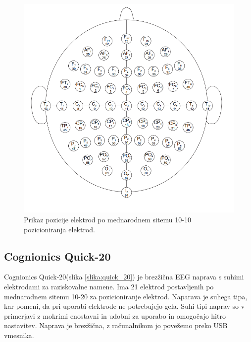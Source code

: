\begin{figure}
        \begin{center}
        \includegraphics[width=1\linewidth]{slike/64electrodeSystem.png}
        \end{center}
        \caption[Mednarodni sitem 10-10 pozicioniranja elektrod.]{Prikaz pozicije elektrod po mednarodnem sitemu 10-10 pozicioniranja elektrod.  \cite{HttpsWwwPhysionet}}
        \label{slika:mednarodni_sistem_10}
        \end{figure}

\newpage

\subsection{Cognionics Quick-20}
Cognionics Quick-20(slika \ref{slika:quick_20}) je brezžična EEG naprava s suhimi elektrodami za raziskovalne namene. Ima 21 elektrod postavljenih po mednarodnem sitemu 10-20 za pozicioniranje elektrod. Naparava je suhega tipa, kar pomeni, da pri uporabi elektrode ne potrebujejo gela. Suhi tipi naprav so v primerjavi z mokrimi enostavni in udobni za uporabo in omogočajo hitro nastavitev. Naprava je brezžična, z računalnikom jo povežemo preko USB vmesnika. \cite{DryEEGHeadset}

